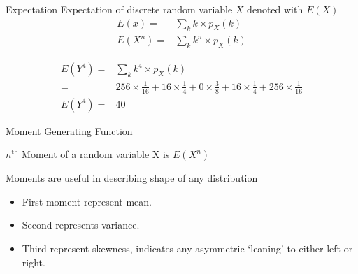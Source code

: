 \documentclass{beamer}
\providecommand{\brak}[1]{\ensuremath{\left(#1\right)}}
\begin{document}
\begin{frame}{}
    \begin{block}{Expectation}
    Expectation of discrete random variable $X$ denoted with $E(X)$
    \begin{align}
        E(x)=&\sum_{k}k\times p_X(k)
        \\E\brak{X^n}=&\sum_{k}k^n\times p_X(k)
    \end{align}
    
    \end{block}
    \begin{block}{}
        \begin{align}
            E\brak{Y^4}=&\sum_{k}k^4\times p_X(k)
            \\ =& 256\times \frac{1}{16}+              16\times \frac{1}{4}+             0\times \frac{3}{8}+             16\times \frac{1}{4}+               256\times \frac{1}{16}
            \\E\brak{Y^4}=&40
        \end{align}
    \end{block}
\end{frame}


\begin{frame}{Moment Generating Function}
    \begin{definition}[Moment]
    $n^{\text{th}}$ Moment of a random variable X is $E\brak{X^n}$ 
    \end{definition}
    
    \begin{block}{}
    Moments are useful in describing shape of any distribution
    \begin{itemize}
        \item First moment represent mean.
        \item Second represents variance.
        \item Third represent skewness, indicates any asymmetric ‘leaning’ to either left or right.
    \end{itemize}
    \end{block}
\end{frame}
\end{document}
